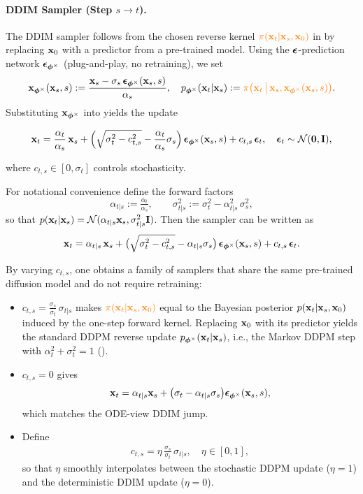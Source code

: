 \paragraph{DDIM Sampler (Step $s\to t$).}
The DDIM sampler follows from the chosen reverse kernel ${\color{orange}\pi({\mathbf{x}}_t|{\mathbf{x}}_s,{\mathbf{x}}_0)}$ in
 by replacing ${\mathbf{x}}_0$ with a predictor from a pre-trained model.
Using the ${\bm{\epsilon}}$-prediction network ${\bm{\epsilon}}_{\bm{\phi}^\times}$ (plug-and-play, no retraining), we set
\[
{\mathbf{x}}_{\bm{\phi}^\times}({\mathbf{x}}_s,s)
:= \frac{{\mathbf{x}}_s - \sigma_s\,{\bm{\epsilon}}_{\bm{\phi}^\times}({\mathbf{x}}_s,s)}{\alpha_s},
\quad
p_{\bm{\phi}^\times}({\mathbf{x}}_t|{\mathbf{x}}_s)
:= {\color{orange}\pi\big({\mathbf{x}}_t\,\big|\,{\mathbf{x}}_s,{\mathbf{x}}_{\bm{\phi}^\times}({\mathbf{x}}_s,s)\big)}.
\]
Substituting ${\mathbf{x}}_{\bm{\phi}^\times}$ into  yields the update
\begin{mdframed}
\[
{\mathbf{x}}_t
= \frac{\alpha_t}{\alpha_s}\,{\mathbf{x}}_s
+\Big(\sqrt{\sigma_t^2 - c_{t,s}^2}-\frac{\alpha_t}{\alpha_s}\sigma_s\Big)\,
{\bm{\epsilon}}_{\bm{\phi}^\times}({\mathbf{x}}_s,s)
+ c_{t,s}\,{\bm{\epsilon}}_t,
\quad {\bm{\epsilon}}_t\sim\mathcal{N}(\mathbf{0},\mathbf{I}),
\]
\end{mdframed}
where $c_{t,s}\in[0,\sigma_t]$ controls stochasticity.

For notational convenience define the forward factors
\[
\alpha_{t|s}:=\tfrac{\alpha_t}{\alpha_s},
\qquad
\sigma_{t|s}^2:=\sigma_t^2-\alpha_{t|s}^2\,\sigma_s^2,
\]
so that $p({\mathbf{x}}_t|{\mathbf{x}}_s)=\mathcal{N}(\alpha_{t|s}{\mathbf{x}}_s,\sigma_{t|s}^2\mathbf{I})$. Then the sampler can be written as
\[
{\mathbf{x}}_t
= \alpha_{t|s}\,{\mathbf{x}}_s
+\big(\sqrt{\sigma_t^2 - c_{t,s}^2}-\alpha_{t|s}\sigma_s\big)\,
{\bm{\epsilon}}_{\bm{\phi}^\times}({\mathbf{x}}_s,s)
+ c_{t,s}\,{\bm{\epsilon}}_t.
\]

By varying $c_{t,s}$, one obtains a family of samplers that share the same pre-trained diffusion model and do not require retraining:
\begin{itemize}
\item {}
$
c_{t,s}=\frac{\sigma_s}{\sigma_t}\,\sigma_{t|s}
$
makes ${\color{orange}\pi({\mathbf{x}}_t|{\mathbf{x}}_s,{\mathbf{x}}_0)}$ equal to the Bayesian posterior
$p({\mathbf{x}}_t|{\mathbf{x}}_s,{\mathbf{x}}_0)$ induced by the one-step forward kernel.
Replacing ${\mathbf{x}}_0$ with its predictor yields the standard DDPM reverse update
$p_{\bm{\phi}^\times}({\mathbf{x}}_t|{\mathbf{x}}_s)$, i.e., the Markov DDPM step with $\alpha_t^2+\sigma_t^2=1$ ().

\item {}
$
c_{t,s}=0
$
gives
\[
{\mathbf{x}}_t
= \alpha_{t|s}{\mathbf{x}}_s + \big(\sigma_t-\alpha_{t|s}\sigma_s\big){\bm{\epsilon}}_{\bm{\phi}^\times}({\mathbf{x}}_s,s),
\]
which matches the ODE-view DDIM jump.

\item {} Define
\begin{align}\label{eq:eta-ddim}
    c_{t,s}=\eta\,\frac{\sigma_s}{\sigma_t}\,\sigma_{t|s}, \quad \eta\in[0,1],
\end{align}
so that $\eta$ smoothly interpolates between the stochastic DDPM update ($\eta=1$) and the deterministic DDIM update ($\eta=0$).
\end{itemize}





